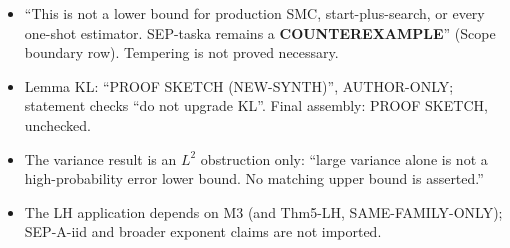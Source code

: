 \begin{notproved}
\begin{itemize}
\item ``This is not a lower bound for production SMC, start-plus-search, or every one-shot estimator. SEP-taska remains a \textbf{COUNTEREXAMPLE}'' (Scope boundary row). Tempering is not proved necessary.
\item Lemma KL: ``PROOF SKETCH (NEW-SYNTH)'', AUTHOR-ONLY; statement checks ``do not upgrade KL''. Final assembly: PROOF SKETCH, unchecked.
\item The variance result is an $L^2$ obstruction only: ``large variance alone is not a high-probability error lower bound. No matching upper bound is asserted.''
\item The LH application depends on M3 (and Thm5-LH, SAME-FAMILY-ONLY); SEP-A-iid and broader exponent claims are not imported.
\end{itemize}
\end{notproved}

